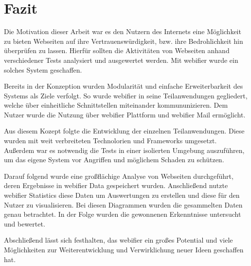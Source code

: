 \chapter{Fazit}

Die Motivation dieser Arbeit war es den Nutzern des Internets eine Möglichkeit zu bieten Webseiten
auf ihre Vertrauenswürdigkeit, bzw. ihre Bedrohlichkeit hin überprüfen zu lassen. Hierfür sollten
die Aktivitäten von Webseiten anhand verschiedener Tests analysiert und ausgewertet werden. Mit
webifier wurde ein solches System geschaffen.

Bereits in der Konzeption wurden Modularität und einfache Erweiterbarkeit des Systems als Ziele
verfolgt. So wurde webifier in seine Teilanwendungen gegliedert, welche über einheitliche
Schnittstellen miteinander kommununizieren. Dem Nutzer wurde die Nutzung über webifier Plattform und
webifier Mail ermöglicht. 

Aus diesem Kozept folgte die Entwicklung der einzelnen Teilanwendungen. Diese wurden mit weit
verbreiteten Technolorien und Frameworks umgesetzt. Außerdem war es notwendig die Tests in einer
isolierten Umgebung auszuführen, um das eigene System vor Angriffen und möglichem Schaden zu
schützen.

Darauf folgend wurde eine großflächige Analyse von Webseiten durchgeführt, deren Ergebnisse in
webifier Data gespeichert wurden. Anschließend nutzte webifier Statistics diese Daten um
Auswertungen zu erstellen und diese für den Nutzer zu visualisieren. Bei diesen Diagrammen wurden
die gesammelten Daten genau betrachtet. In der Folge wurden die gewonnenen Erkenntnisse
untersucht und bewertet.

Abschließend lässt sich festhalten, das webifier ein großes Potential und viele Möglichkeiten zur
Weiterentwicklung und Verwirklichung neuer Ideen geschaffen hat.